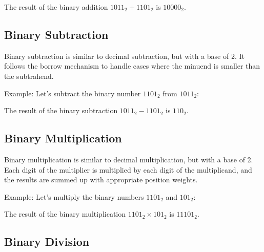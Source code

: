 \documentclass{article}
\begin{document}
The result of the binary addition $1011_2 + 1101_2$ is $10000_2$.

\subsection{Binary Subtraction}

Binary subtraction is similar to decimal subtraction, but with a base of 2. It follows the borrow mechanism to handle cases where the minuend is smaller than the subtrahend.

Example: Let's subtract the binary number $1101_2$ from $1011_2$:

The result of the binary subtraction $1011_2 - 1101_2$ is $110_2$.

\subsection{Binary Multiplication}

Binary multiplication is similar to decimal multiplication, but with a base of 2. Each digit of the multiplier is multiplied by each digit of the multiplicand, and the results are summed up with appropriate position weights.

Example: Let's multiply the binary numbers $1101_2$ and $101_2$:

The result of the binary multiplication $1101_2 \times 101_2$ is $11101_2$.

\subsection{Binary Division}
\end{document}

